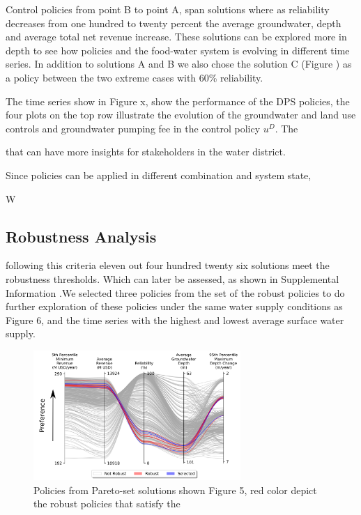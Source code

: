 \documentclass[11pt,a4paper]{article}
\begin{document}
Control policies from point B to point A, span solutions where as reliability decreases from one hundred to twenty percent the average groundwater, depth and average total net revenue increase. These solutions can be explored more in depth to see how policies and the food-water system is evolving in different time series. In addition to solutions A and B we also chose the solution C (Figure ) as a policy between the two extreme cases with 60\% reliability. 

The time series show in Figure x, show the performance of the DPS policies, the four plots on the top row illustrate the evolution of the groundwater and land use controls and groundwater pumping fee in the control policy $u^{D}$. The 


that can have more insights for stakeholders in the water district. 

Since policies can be applied in different combination and system state, 


W


\subsection{Robustness Analysis}

following this criteria eleven out four hundred twenty six solutions meet the robustness thresholds. Which can later be assessed, as shown in Supplemental Information .We selected three policies from the set of the robust policies to do further exploration of these policies under the same water supply conditions as Figure 6, and the time series with the highest and lowest average surface water supply. 

\begin{figure}[H]
    \centering
    \includegraphics[width=0.7\textwidth]{selected_robust.png}
    \caption{Policies from Pareto-set solutions shown Figure 5, red color depict the robust policies that satisfy the } \label{fig:parallel_robustness}
\end{figure}
\end{document}
